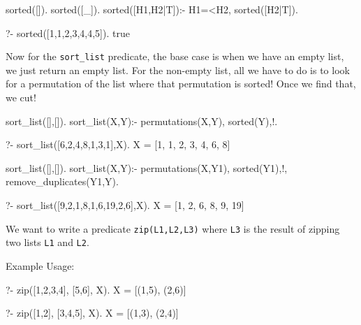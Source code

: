 \begin{codeblock}
sorted([]).
sorted([_]).
sorted([H1,H2|T]):- 
    H1=<H2, 
    sorted([H2|T]).
\end{codeblock}

\begin{codeblock}
?- sorted([1,1,2,3,4,4,5]).
true
\end{codeblock}

Now for the \texttt{sort\_list} predicate, the base case is when we have an empty list, we just return an empty list. For the non-empty list, all we have to do is to look for a permutation of the list where that permutation is sorted! Once we find that, we cut!

\begin{codeblock}
sort_list([],[]).
sort_list(X,Y):-
    permutations(X,Y),
    sorted(Y),!. 
\end{codeblock}

\begin{codeblock}
?- sort_list([6,2,4,8,1,3,1],X).
X = [1, 1, 2, 3, 4, 6, 8]
\end{codeblock}



\begin{codeblock}
sort_list([],[]).
sort_list(X,Y):-
    permutations(X,Y1),
    sorted(Y1),!,
    remove_duplicates(Y1,Y).
\end{codeblock}

\begin{codeblock}
?- sort_list([9,2,1,8,1,6,19,2,6],X).
X = [1, 2, 6, 8, 9, 19]
\end{codeblock}





We want to write a predicate \texttt{zip(L1,L2,L3)} where \texttt{L3} is the result of zipping two lists \texttt{L1} and \texttt{L2}. 

Example Usage:
\begin{codeblock}
?- zip([1,2,3,4], [5,6], X).
X = [(1,5), (2,6)]

?- zip([1,2], [3,4,5], X).
X = [(1,3), (2,4)]
\end{codeblock}

